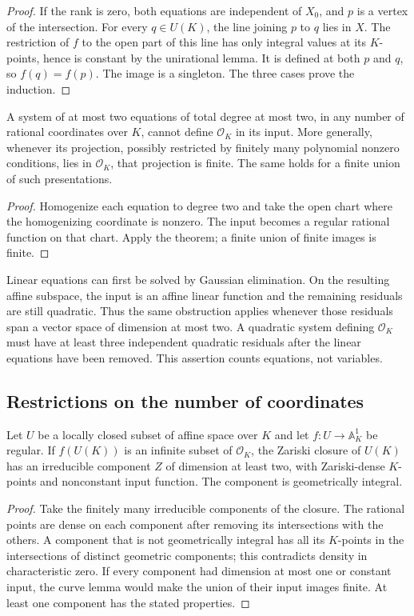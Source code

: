 \begin{proof}
If the rank is zero, both equations are independent of $X_0$,
and $p$ is a vertex of the intersection.  For every $q\in U(K)$,
the line joining $p$ to $q$ lies in $X$.  The restriction of $f$
to the open part of this line has only integral values at its
$K$-points, hence is constant by the unirational lemma.  It is
defined at both $p$ and $q$, so $f(q)=f(p)$.  The image is a
singleton.  The three cases prove the induction.
\end{proof}

\begin{corollary}\label{p3sys:two-quadratics-affine}
A system of at most two equations of total degree at most two,
in any number of rational coordinates over $K$, cannot define
$\mathcal O_K$ in its input.  More generally, whenever its
projection, possibly restricted by finitely many polynomial
nonzero conditions, lies in $\mathcal O_K$, that projection is
finite.  The same holds for a finite union of such presentations.
\end{corollary}
\begin{proof}
Homogenize each equation to degree two and take the open chart
where the homogenizing coordinate is nonzero.  The input becomes
a regular rational function on that chart.  Apply the theorem;
a finite union of finite images is finite.
\end{proof}

Linear equations can first be solved by Gaussian elimination.  On the
resulting affine subspace, the input is an affine linear function and
the remaining residuals are still quadratic.  Thus the same obstruction
applies whenever those residuals span a vector space of dimension at
most two.  A quadratic system defining $\mathcal O_K$ must have at
least three independent quadratic residuals after the linear equations
have been removed.  This assertion counts equations, not variables.

\subsection{Restrictions on the number of coordinates}

\begin{lemma}\label{p3sys:horizontal-closure}
Let $U$ be a locally closed subset of affine space over $K$ and
let $f:U\to\mathbb A^1_K$ be regular.  If $f(U(K))$ is an
infinite subset of $\mathcal O_K$, the Zariski closure of $U(K)$
has an irreducible component $Z$ of dimension at least two,
with Zariski-dense $K$-points and nonconstant input function.
The component is geometrically integral.
\end{lemma}
\begin{proof}
Take the finitely many irreducible components of the closure.  The
rational points are dense on each component after removing its
intersections with the others.  A component that is not geometrically
integral has all its $K$-points in the intersections of distinct
geometric components; this contradicts density in characteristic
zero.  If every component had dimension at most one or constant
input, the curve lemma would make the union of their input images
finite.  At least one component has the stated properties.
\end{proof}

